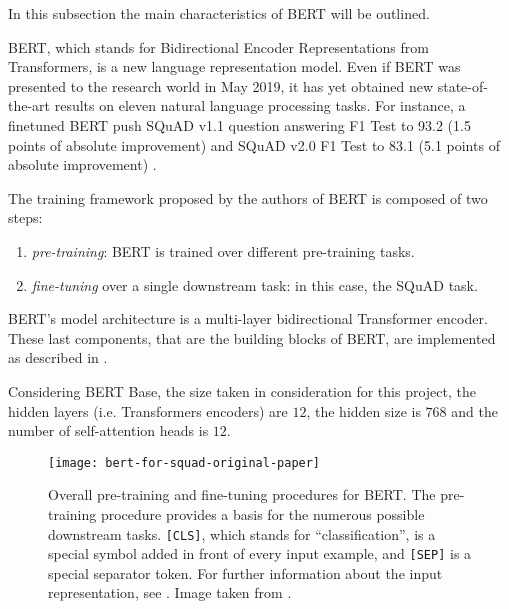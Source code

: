 In this subsection the main characteristics of BERT will be outlined.

BERT, which stands for Bidirectional Encoder Representations from Transformers, is a new language representation model. Even if BERT was presented to the research world in May 2019, it has yet obtained new state-of-the-art results on eleven natural language processing tasks. For instance, a finetuned BERT push SQuAD v1.1 question answering F1 Test to 93.2 (1.5 points of absolute improvement) and SQuAD v2.0 F1 Test to 83.1 (5.1 points of absolute improvement) \cite{bert}.

The training framework proposed by the authors of BERT is composed of two steps:
\begin{enumerate}
  \item \textit{pre-training}: BERT is trained over different pre-training tasks.
  \item \textit{fine-tuning} over a single downstream task: in this case, the SQuAD task.
\end{enumerate}

BERT’s  model  architecture is a multi-layer bidirectional Transformer encoder. These last components, that are the building blocks of BERT, are implemented as described in \cite{attentionisallyouneed}.

Considering BERT Base, the size taken in consideration for this project, the hidden layers (i.e. Transformers encoders) are $12$, the hidden size is $768$ and the number of self-attention heads is $12$.

\begin{figure}[t]
\centering
\texttt{[image: bert-for-squad-original-paper]}
\caption{Overall pre-training and fine-tuning procedures for BERT. The pre-training procedure provides a basis for the numerous possible downstream tasks. \texttt{[CLS]}, which stands for ``classification'', is a special symbol added in front of every input example, and \texttt{[SEP]} is a special separator token. For further information about the input representation, see \cite{bert}. Image taken from \cite{bert}.}
\medskip
\label{fig:bertsquad}
\end{figure}

